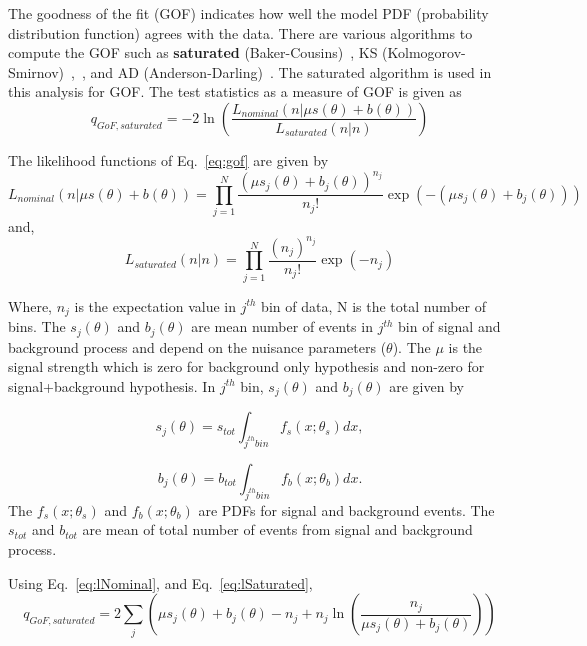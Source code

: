 The goodness of the fit (GOF) indicates how well the model PDF (probability
distribution function) agrees with the data. There are various algorithms to
compute the GOF such as {\bf{saturated}} (Baker-Cousins)~\cite{Baker:1983tu}, KS
(Kolmogorov-Smirnov)~\cite{ks1},~\cite{smirnov1948}, and
AD (Anderson-Darling)~\cite{anderson1952}. The saturated algorithm is used in this analysis
for GOF. The test statistics as a measure of GOF is given as \cite{Baker:1983tu}
\begin{equation}
q_{GoF, saturated} = -2\ln \left(\frac{L_{nominal} (n|\mu s(\theta) + b(\theta))}{L_{saturated}(n|n)}\right)
\label{eq:gof}
\end{equation}

The likelihood functions of Eq.~\ref{eq:gof} are given by
\begin{equation}
L_{nominal} (n|\mu s(\theta) + b(\theta)) = \prod_{j=1}^N \frac{(\mu s_j(\theta) + b_j(\theta))^{n_j}}{n_{j}!} \exp(-(\mu s_j(\theta) + b_j(\theta)))
\label{eq:lNominal}
\end{equation}
and,
\begin{equation}
L_{saturated} (n|n) = \prod_{j=1}^N \frac{(n_j)^{n_j}}{n_{j}!} \exp(-n_j)
\label{eq:lSaturated}
\end{equation}


Where, $n_j$ is the expectation value in $j^{th}$ bin of data, N is the total number of bins. The
$s_j(\theta)$ and $b_j(\theta)$ are mean number of events in $j^{th}$ bin of signal and background
process and depend on the nuisance parameters ($\theta$). The $\mu$ is the signal strength which is
zero for background only hypothesis and non-zero for signal+background hypothesis. In $j^{th}$ bin,
$s_j(\theta)$ and $b_j(\theta)$ are given by \cite{Cowan:2010js}

\begin{equation}
s_{j}(\theta) = s_{tot}\int_{j^{th} bin} f_s(x; \theta_s)dx,
\end{equation}

\begin{equation}
b_{j}(\theta) = b_{tot}\int_{j^{th} bin} f_b(x; \theta_b)dx.
\end{equation}
The $f_s(x; \theta_s)$ and $f_b(x; \theta_b)$ are PDFs for signal and background events.
The $s_{tot}$ and $b_{tot}$ are mean of total number of events from signal and background process.

Using Eq.~\ref{eq:lNominal}, and Eq.~\ref{eq:lSaturated},
\begin{equation}
q_{GoF, saturated} = 2\sum_{j}\left(\mu s_j(\theta) + b_j(\theta) - n_j + n_j\ln\left(\frac{n_j}{\mu s_j(\theta) + b_j(\theta)}\right)\right)
\label{eq:gofFinal}
\end{equation}


